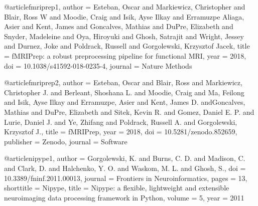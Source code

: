 @article{fmriprep1,
    author = {Esteban, Oscar and Markiewicz, Christopher and Blair, Ross W and Moodie, Craig and Isik, Ayse Ilkay and Erramuzpe Aliaga, Asier and Kent, James and Goncalves, Mathias and DuPre, Elizabeth and Snyder, Madeleine and Oya, Hiroyuki and Ghosh, Satrajit and Wright, Jessey and Durnez, Joke and Poldrack, Russell and Gorgolewski, Krzysztof Jacek},
    title = {{fMRIPrep}: a robust preprocessing pipeline for functional {MRI}},
    year = {2018},
    doi = {10.1038/s41592-018-0235-4},
    journal = {Nature Methods}
}

@article{fmriprep2,
    author = {Esteban, Oscar and Blair, Ross and Markiewicz, Christopher J. and Berleant, Shoshana L. and Moodie, Craig and Ma, Feilong and Isik, Ayse Ilkay and Erramuzpe, Asier and Kent, James D. andGoncalves, Mathias and DuPre, Elizabeth and Sitek, Kevin R. and Gomez, Daniel E. P. and Lurie, Daniel J. and Ye, Zhifang and Poldrack, Russell A. and Gorgolewski, Krzysztof J.},
    title = {fMRIPrep},
    year = 2018,
    doi = {10.5281/zenodo.852659},
    publisher = {Zenodo},
    journal = {Software}
}

@article{nipype1,
    author = {Gorgolewski, K. and Burns, C. D. and Madison, C. and Clark, D. and Halchenko, Y. O. and Waskom, M. L. and Ghosh, S.},
    doi = {10.3389/fninf.2011.00013},
    journal = {Frontiers in Neuroinformatics},
    pages = 13,
    shorttitle = {Nipype},
    title = {Nipype: a flexible, lightweight and extensible neuroimaging data processing framework in Python},
    volume = 5,
    year = 2011
}


